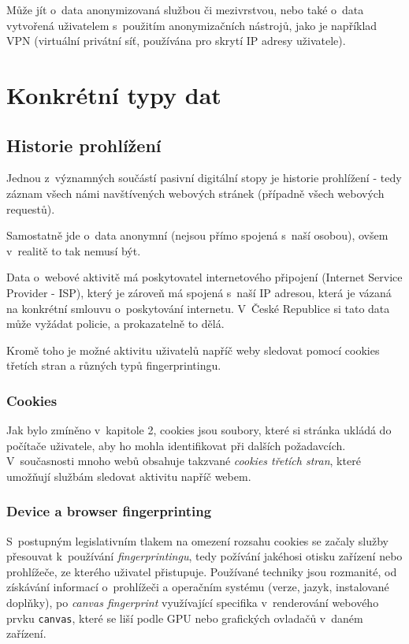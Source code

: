 Může jít o~data anonymizovaná službou či mezivrstvou, nebo také o~data vytvořená uživatelem s~použitím anonymizačních nástrojů, jako je například VPN (virtuální privátní síť, používána pro skrytí IP adresy uživatele).

\section{Konkrétní typy dat}

\subsection{Historie prohlížení}
Jednou z~významných součástí pasivní digitální stopy je historie prohlížení - tedy záznam všech námi navštívených webových stránek (případně všech webových requestů).

Samostatně jde o~data anonymní (nejsou přímo spojená s~naší osobou), ovšem v~realitě to tak nemusí být.

Data o~webové aktivitě má poskytovatel internetového připojení (Internet Service Provider - ISP), který je zároveň má spojená s~naší IP adresou, která je vázaná na konkrétní smlouvu o~poskytování internetu. V~České Republice si tato data může vyžádat policie, a prokazatelně to dělá\citep{policie-isp}.

Kromě toho je možné aktivitu uživatelů napříč weby sledovat pomocí cookies třetích stran a různých typů fingerprintingu.
\subsubsection{Cookies}
Jak bylo zmíněno v~kapitole 2, cookies jsou soubory, které si stránka ukládá do počítače uživatele, aby ho mohla identifikovat při dalších požadavcích. V~současnosti mnoho webů obsahuje takzvané \textit{cookies třetích stran}, které umožňují službám sledovat aktivitu napříč webem.

\subsubsection{Device a browser fingerprinting}
S~postupným legislativním tlakem na omezení rozsahu cookies se začaly služby přesouvat k~používání \textit{fingerprintingu}, tedy požívání jakéhosi otisku zařízení nebo prohlížeče, ze kterého uživatel přistupuje. Používané techniky jsou rozmanité, od získávání informací o~prohlížeči a operačním systému (verze, jazyk, instalované doplňky), po \textit{canvas fingerprint} využívající specifika v~renderování webového prvku \verb|canvas|, které se liší podle GPU nebo grafických ovladačů v~daném zařízení.  

